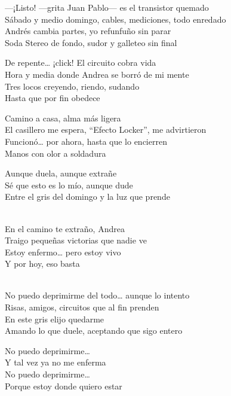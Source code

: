 \begin{lyrics}
—¡Listo! —grita Juan Pablo— es el transistor quemado\\
Sábado y medio domingo, cables, mediciones, todo enredado\\
Andrés cambia partes, yo refunfuño sin parar\\
Soda Stereo de fondo, sudor y galleteo sin final

De repente… ¡click! El circuito cobra vida\\
Hora y media donde Andrea se borró de mi mente\\
Tres locos creyendo, riendo, sudando\\
Hasta que por fin obedece

Camino a casa, alma más ligera\\
El casillero me espera, “Efecto Locker”, me advirtieron\\
Funcionó… por ahora, hasta que lo encierren\\
Manos con olor a soldadura

Aunque duela, aunque extrañe\\
Sé que esto es lo mío, aunque dude\\
Entre el gris del domingo y la luz que prende

\\
En el camino te extraño, Andrea\\
Traigo pequeñas victorias que nadie ve\\
Estoy enfermo… pero estoy vivo\\
Y por hoy, eso basta

\\
No puedo deprimirme del todo… aunque lo intento\\
Risas, amigos, circuitos que al fin prenden\\
En este gris elijo quedarme\\
Amando lo que duele, aceptando que sigo entero

No puedo deprimirme…\\
Y tal vez ya no me enferma\\
No puedo deprimirme…\\
Porque estoy donde quiero estar
\end{lyrics}

